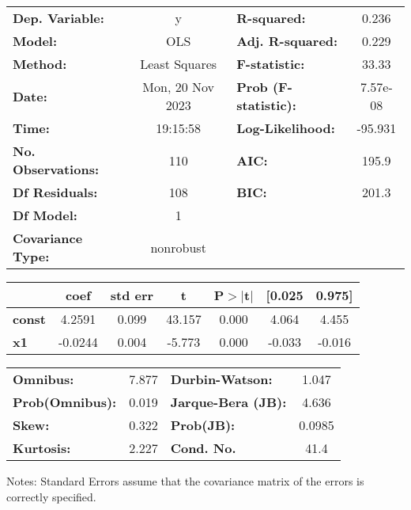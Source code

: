 \begin{center}
\begin{tabular}{lclc}
\toprule
\textbf{Dep. Variable:}    &        y         & \textbf{  R-squared:         } &     0.236   \\
\textbf{Model:}            &       OLS        & \textbf{  Adj. R-squared:    } &     0.229   \\
\textbf{Method:}           &  Least Squares   & \textbf{  F-statistic:       } &     33.33   \\
\textbf{Date:}             & Mon, 20 Nov 2023 & \textbf{  Prob (F-statistic):} &  7.57e-08   \\
\textbf{Time:}             &     19:15:58     & \textbf{  Log-Likelihood:    } &   -95.931   \\
\textbf{No. Observations:} &         110      & \textbf{  AIC:               } &     195.9   \\
\textbf{Df Residuals:}     &         108      & \textbf{  BIC:               } &     201.3   \\
\textbf{Df Model:}         &           1      & \textbf{                     } &             \\
\textbf{Covariance Type:}  &    nonrobust     & \textbf{                     } &             \\
\bottomrule
\end{tabular}
\begin{tabular}{lcccccc}
               & \textbf{coef} & \textbf{std err} & \textbf{t} & \textbf{P$> |$t$|$} & \textbf{[0.025} & \textbf{0.975]}  \\
\midrule
\textbf{const} &       4.2591  &        0.099     &    43.157  &         0.000        &        4.064    &        4.455     \\
\textbf{x1}    &      -0.0244  &        0.004     &    -5.773  &         0.000        &       -0.033    &       -0.016     \\
\bottomrule
\end{tabular}
\begin{tabular}{lclc}
\textbf{Omnibus:}       &  7.877 & \textbf{  Durbin-Watson:     } &    1.047  \\
\textbf{Prob(Omnibus):} &  0.019 & \textbf{  Jarque-Bera (JB):  } &    4.636  \\
\textbf{Skew:}          &  0.322 & \textbf{  Prob(JB):          } &   0.0985  \\
\textbf{Kurtosis:}      &  2.227 & \textbf{  Cond. No.          } &     41.4  \\
\bottomrule
\end{tabular}
\end{center}

Notes: \newline
 [1] Standard Errors assume that the covariance matrix of the errors is correctly specified.